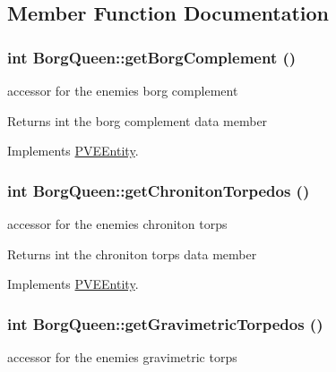 \subsection{Member Function Documentation}
\hypertarget{classBorgQueen_aaceb90436d0f878f38346fcc6cfc846c}{
\subsubsection[{getBorgComplement}]{\setlength{\rightskip}{0pt plus 5cm}int BorgQueen::getBorgComplement ()}}
\label{d6/d8d/classBorgQueen_aaceb90436d0f878f38346fcc6cfc846c}
accessor for the enemies borg complement

\begin{DoxyReturn}{Returns}
int the borg complement data member 
\end{DoxyReturn}


Implements \hyperlink{classPVEEntity}{PVEEntity}.

\hypertarget{classBorgQueen_ac533d0fde52c0119abb63862b1c9b01e}{
\subsubsection[{getChronitonTorpedos}]{\setlength{\rightskip}{0pt plus 5cm}int BorgQueen::getChronitonTorpedos ()}}
\label{d6/d8d/classBorgQueen_ac533d0fde52c0119abb63862b1c9b01e}
accessor for the enemies chroniton torps

\begin{DoxyReturn}{Returns}
int the chroniton torps data member 
\end{DoxyReturn}


Implements \hyperlink{classPVEEntity}{PVEEntity}.

\hypertarget{classBorgQueen_ac4e4aff8c051083941bcb7d9c8ae4525}{
\subsubsection[{getGravimetricTorpedos}]{\setlength{\rightskip}{0pt plus 5cm}int BorgQueen::getGravimetricTorpedos ()}}
\label{d6/d8d/classBorgQueen_ac4e4aff8c051083941bcb7d9c8ae4525}
accessor for the enemies gravimetric torps

